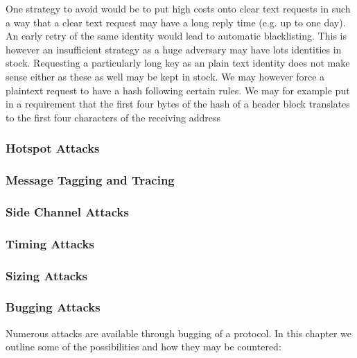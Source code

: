 One strategy to avoid would be to put high costs onto clear text requests in such a way that a clear text request may have a long reply time (e.g. up to one day). An early retry of the same identity would lead to automatic blacklisting. This is however an insufficient strategy as a huge adversary may have lots identities in stock. Requesting a particularly long key as an plain text identity does not make sense either as these as well may be kept in stock. We may however force a plaintext request to have a hash following certain rules. We may for example put in a requirement that the first four bytes of the hash of a header block translates to the first four characters of the receiving address



\subsubsection{Hotspot Attacks}

\subsubsection{Message Tagging and Tracing}

\subsubsection{Side Channel Attacks}

\subsubsection{Timing Attacks}

\subsubsection{Sizing Attacks}

\subsubsection{Bugging Attacks}
Numerous attacks are available through bugging of a protocol. In this chapter we outline some of the possibilities and how they may be countered:

